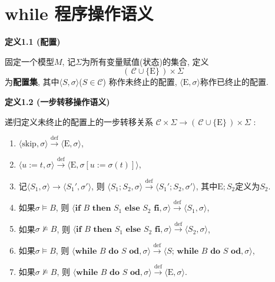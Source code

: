 \documentclass[UTF8]{ctexart}
\begin{document}
\setlength{\abovedisplayskip}{1pt}
\setlength{\belowdisplayskip}{1pt}

\section{while 程序操作语义}

\hypertarget{sec:定义1.1}{}
\noindent\textbf{定义1.1 (配置)}

固定一个模型$M$, 记$\Sigma$为所有变量赋值(状态)的集合, 定义
\[
    (\,\mathcal{C}\cup\{\mathrm{E}\}\,)\times\Sigma
\]
为\textbf{配置集}, 其中$\langle S,\sigma\rangle$($S\in\mathcal{C}$)
称作未终止的配置, $\langle\mathrm{E},\sigma\rangle$称作已终止的配置.

\vspace{10pt}

\hypertarget{sec:定义1.2}{}
\noindent\textbf{定义1.2 (一步转移操作语义)}

递归定义未终止的配置上的一步转移关系
\vspace{3pt}
$\mathcal{C}\times\Sigma\to(\,\mathcal{C}\cup\{\mathrm{E}\}\,)\times\Sigma$ :
\begin{enumerate}
    \item $\langle\mathrm{skip},\sigma\rangle\overset{\mathrm{def}}{\to}
    \langle\mathrm{E},\sigma\rangle$,
    \item $\langle u:=t,\sigma\rangle\overset{\mathrm{def}}{\to}
    \langle\mathrm{E},\sigma[u:=\sigma(t)]\rangle$,
    \item 记$\langle S_1,\sigma\rangle\to\langle S_1',\sigma'\rangle$, 则
    $\langle S_1;S_2,\sigma\rangle\overset{\mathrm{def}}{\to}
    \langle S_1';S_2,\sigma'\rangle$, 其中$\mathrm{E};S_2$定义为$S_2$.
    \item 如果$\sigma\models B$, 则
    $\langle\mathbf{if}\,\,B\,\,\mathbf{then}\,\,S_1\,\,\mathbf{else}\,\,S_2
    \,\,\mathbf{fi},\sigma\rangle\overset{\mathrm{def}}{\to}
    \langle S_1,\sigma\rangle$,
    \item 如果$\sigma\not\models B$, 则
    $\langle\mathbf{if}\,\,B\,\,\mathbf{then}\,\,S_1\,\,\mathbf{else}\,\,S_2
    \,\,\mathbf{fi},\sigma\rangle\overset{\mathrm{def}}{\to}
    \langle S_2,\sigma\rangle$,
    \item 如果$\sigma\models B$, 则
    $\langle\mathbf{while}\,\,B\,\,\mathbf{do}\,\,S\,\,\mathbf{od},\sigma\rangle
    \overset{\mathrm{def}}{\to}\langle S;
    \,\mathbf{while}\,\,B\,\,\mathbf{do}\,\,S\,\,\mathbf{od},\sigma\rangle$,
    \item 如果$\sigma\not\models B$, 则
    $\langle\mathbf{while}\,\,B\,\,\mathbf{do}\,\,S\,\,\mathbf{od},\sigma\rangle
    \overset{\mathrm{def}}{\to}\langle\mathrm{E},\sigma\rangle$.
\end{enumerate}
\end{document}
